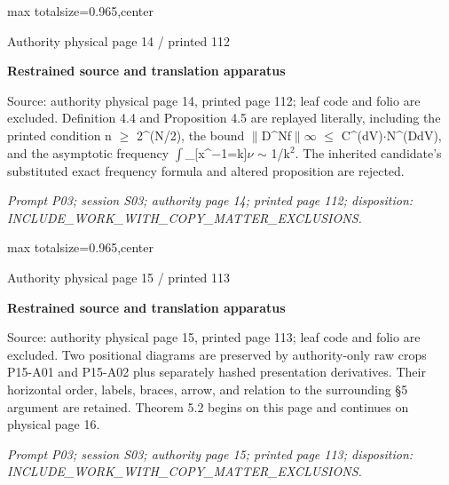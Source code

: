\documentclass{article}
\begin{document}
\newpage
\noindent\begin{adjustbox}{max totalsize={\textwidth}{0.965\textheight},center}\begin{minipage}{\textwidth}
\noindent\hfill\scriptsize Authority physical page 14 / printed 112\par\normalsize
\textbf{Restrained source and translation apparatus}\par
Source: authority physical page 14, printed page 112; leaf code and folio are excluded. Definition 4.4 and Proposition 4.5 are replayed literally, including the printed condition n \ensuremath{\geq} 2\textasciicircum{}(N/2), the bound \ensuremath{\lVert}D\textasciicircum{}Nf\ensuremath{\lVert}\ensuremath{\infty} \ensuremath{\leq} C\textasciicircum{}(dV)\ensuremath{\cdot}N\textasciicircum{}(DdV), and the asymptotic frequency \ensuremath{\int}\_[x\textasciicircum{}\ensuremath{-}1=k]\ensuremath{\nu} \ensuremath{\sim} 1/k\ensuremath{{}^{2}}. The inherited candidate’s substituted exact frequency formula and altered proposition are rejected.
\par\smallskip
\textit{Prompt P03; session S03; authority page 14; printed page 112; disposition: INCLUDE\_WORK\_WITH\_COPY\_MATTER\_EXCLUSIONS.}
\end{minipage}\end{adjustbox}

\newpage
\noindent\begin{adjustbox}{max totalsize={\textwidth}{0.965\textheight},center}\begin{minipage}{\textwidth}
\noindent\hfill\scriptsize Authority physical page 15 / printed 113\par\normalsize
\textbf{Restrained source and translation apparatus}\par
Source: authority physical page 15, printed page 113; leaf code and folio are excluded. Two positional diagrams are preserved by authority-only raw crops P15-A01 and P15-A02 plus separately hashed presentation derivatives. Their horizontal order, labels, braces, arrow, and relation to the surrounding §5 argument are retained. Theorem 5.2 begins on this page and continues on physical page 16.
\par\smallskip
\textit{Prompt P03; session S03; authority page 15; printed page 113; disposition: INCLUDE\_WORK\_WITH\_COPY\_MATTER\_EXCLUSIONS.}
\end{minipage}\end{adjustbox}
\end{document}
